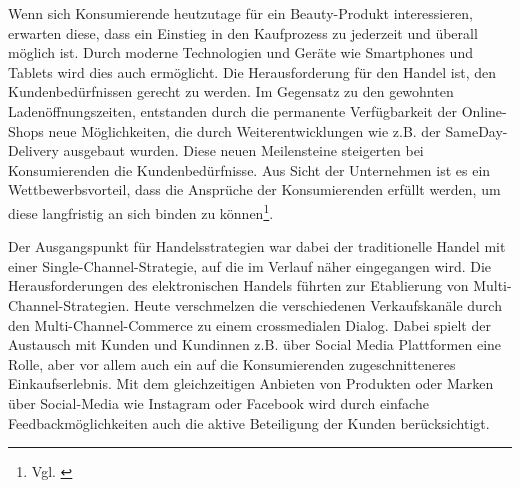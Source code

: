 Wenn sich Konsumierende heutzutage für ein Beauty-Produkt interessieren, erwarten diese, dass ein Einstieg in den Kaufprozess zu jederzeit und überall möglich ist. Durch moderne Technologien und Geräte wie Smartphones und Tablets wird dies auch ermöglicht.
Die Herausforderung für den Handel ist, den Kundenbedürfnissen gerecht zu werden. Im Gegensatz zu den gewohnten Ladenöffnungszeiten, entstanden durch die permanente Verfügbarkeit der Online-Shops neue Möglichkeiten, die durch Weiterentwicklungen wie z.B. der SameDay-Delivery ausgebaut wurden. Diese neuen Meilensteine steigerten bei Konsumierenden die Kundenbedürfnisse. Aus Sicht der Unternehmen ist es ein Wettbewerbsvorteil, dass die Ansprüche der Konsumierenden erfüllt werden, um diese langfristig an sich binden zu können\footnote{Vgl. \autocite [Online] {walkersands2018}}.
\newline

Der Ausgangspunkt für Handelsstrategien war dabei der traditionelle Handel mit einer Single-Channel-Strategie, auf die im Verlauf näher eingegangen wird. Die Herausforderungen des elektronischen Handels führten zur Etablierung von Multi-Channel-Strategien. Heute verschmelzen die verschiedenen Verkaufskanäle durch den Multi-Channel-Commerce zu einem crossmedialen Dialog. Dabei spielt der Austausch mit Kunden und Kundinnen z.B. über Social Media Plattformen eine Rolle, aber vor allem auch ein auf die Konsumierenden zugeschnitteneres Einkaufserlebnis. Mit dem gleichzeitigen Anbieten von Produkten oder Marken über Social-Media wie Instagram oder Facebook wird durch einfache Feedbackmöglichkeiten auch die aktive Beteiligung der Kunden berücksichtigt.
\newline

